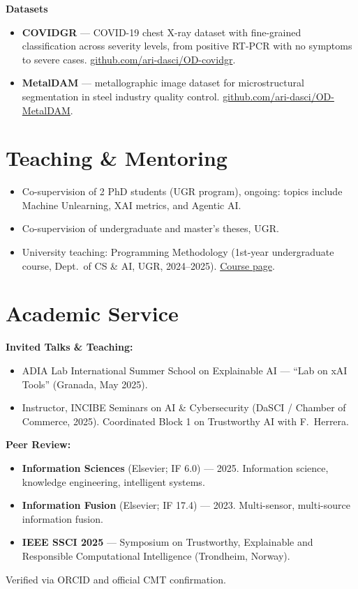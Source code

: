 \documentclass[10pt,a4paper]{article}
\newcommand{\blueitem}[1]{\textcolor{subtitleblue}{\textbf{#1}}}
\begin{document}
\blueitem{Datasets}
\begin{itemize}
    \item \textbf{COVIDGR} --- COVID-19 chest X-ray dataset with fine-grained classification across severity levels, from positive RT-PCR with no symptoms to severe cases. \href{https://github.com/ari-dasci/OD-covidgr}{github.com/ari-dasci/OD-covidgr}.
    \item \textbf{MetalDAM} --- metallographic image dataset for microstructural segmentation in steel industry quality control. \href{https://github.com/ari-dasci/OD-MetalDAM}{github.com/ari-dasci/OD-MetalDAM}.
\end{itemize}

\section*{Teaching \& Mentoring}

\begin{itemize}
    \item Co-supervision of 2 PhD students (UGR program), ongoing: topics include Machine Unlearning, XAI metrics, and Agentic AI.
    \item Co-supervision of undergraduate and master's theses, UGR.
    \item University teaching: Programming Methodology (1st-year undergraduate course, Dept.~of CS \& AI, UGR, 2024--2025). \href{https://grados.ugr.es/ramas/ingenieria-arquitectura/grado-ingenieria-informatica/metodologia-la-programacion}{Course page}.
\end{itemize}

\section*{Academic Service}

\blueitem{Invited Talks \& Teaching:}
\begin{itemize}
    \item ADIA Lab International Summer School on Explainable AI --- ``Lab on xAI Tools'' (Granada, May 2025).
    \item Instructor, INCIBE Seminars on AI \& Cybersecurity (DaSCI / Chamber of Commerce, 2025). Coordinated Block 1 on Trustworthy AI with F.~Herrera.
\end{itemize}

\blueitem{Peer Review:}
\begin{itemize}
    \item \textbf{Information Sciences} (Elsevier; IF 6.0) --- 2025. Information science, knowledge engineering, intelligent systems.
    \item \textbf{Information Fusion} (Elsevier; IF 17.4) --- 2023. Multi-sensor, multi-source information fusion.
    \item \textbf{IEEE SSCI 2025} --- Symposium on Trustworthy, Explainable and Responsible Computational Intelligence (Trondheim, Norway).
\end{itemize}
Verified via ORCID and official CMT confirmation.
\end{document}
